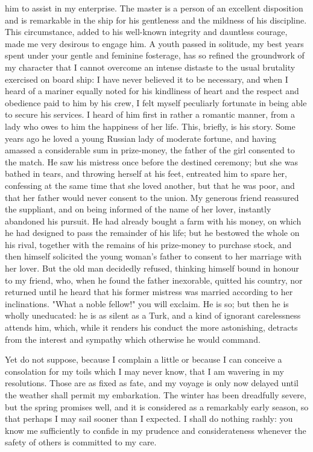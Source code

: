 him to assist in my enterprise. The master is a person of an excellent disposition and is remarkable in the ship for his gentleness and the mildness of his discipline. This circumstance, added to his well-known integrity and dauntless courage, made me very desirous to engage him. A youth passed in solitude, my best years spent under your gentle and feminine fosterage, has so refined the groundwork of my character that I cannot overcome an intense distaste to the usual brutality exercised on board ship: I have never believed it to be necessary, and when I heard of a mariner equally noted for his kindliness of heart and the respect and obedience paid to him by his crew, I felt myself peculiarly fortunate in being able to secure his services. I heard of him first in rather a romantic manner, from a lady who owes to him the happiness of her life. This, briefly, is his story. Some years ago he loved a young Russian lady of moderate fortune, and having amassed a considerable sum in prize-money, the father of the girl consented to the match. He saw his mistress once before the destined ceremony; but she was bathed in tears, and throwing herself at his feet, entreated him to spare her, confessing at the same time that she loved another, but that he was poor, and that her father would never consent to the union. My generous friend reassured the suppliant, and on being informed of the name of her lover, instantly abandoned his pursuit. He had already bought a farm with his money, on which he had designed to pass the remainder of his life; but he bestowed the whole on his rival, together with the remains of his prize-money to purchase stock, and then himself solicited the young woman's father to consent to her marriage with her lover. But the old man decidedly refused, thinking himself bound in honour to my friend, who, when he found the father inexorable, quitted his country, nor returned until he heard that his former mistress was married according to her inclinations. "What a noble fellow!" you will exclaim. He is so; but then he is wholly uneducated: he is as silent as a Turk, and a kind of ignorant carelessness attends him, which, while it renders his conduct the more astonishing, detracts from the interest and sympathy which otherwise he would command.

Yet do not suppose, because I complain a little or because I can conceive a consolation for my toils which I may never know, that I am wavering in my resolutions. Those are as fixed as fate, and my voyage is only now delayed until the weather shall permit my embarkation. The winter has been dreadfully severe, but the spring promises well, and it is considered as a remarkably early season, so that perhaps I may sail sooner than I expected. I shall do nothing rashly: you know me sufficiently to confide in my prudence and considerateness whenever the safety of others is committed to my care.

